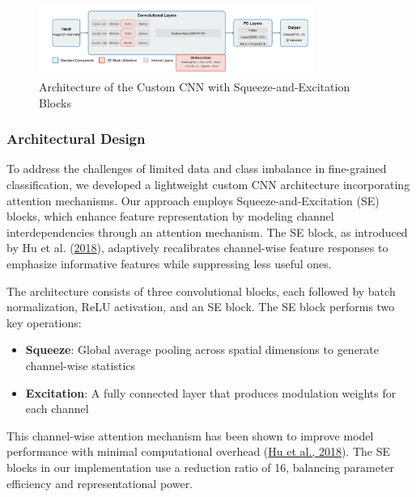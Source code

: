 \documentclass[a4paper,12pt]{report}
\begin{document}
\begin{figure}[h]
    \centering
    \includegraphics[width=0.8\textwidth]{images/architecture/improvedcnn.png}
    \caption{Architecture of the Custom CNN with Squeeze-and-Excitation Blocks}
    \label{fig:improvedcnn_architecture}
\end{figure}

\subsubsection{Architectural Design}

To address the challenges of limited data and class imbalance in fine-grained classification, we developed a lightweight custom CNN architecture incorporating attention mechanisms. Our approach employs Squeeze-and-Excitation (SE) blocks, which enhance feature representation by modeling channel interdependencies through an attention mechanism. The SE block, as introduced by Hu et al. (\href{https://openaccess.thecvf.com/content_cvpr_2018/papers/Hu_Squeeze-and-Excitation_Networks_CVPR_2018_paper.pdf}{2018}), adaptively recalibrates channel-wise feature responses to emphasize informative features while suppressing less useful ones.

The architecture consists of three convolutional blocks, each followed by batch normalization, ReLU activation, and an SE block. The SE block performs two key operations:
\begin{itemize}
    \item \textbf{Squeeze}: Global average pooling across spatial dimensions to generate channel-wise statistics
    \item \textbf{Excitation}: A fully connected layer that produces modulation weights for each channel
\end{itemize}

This channel-wise attention mechanism has been shown to improve model performance with minimal computational overhead (\href{https://openaccess.thecvf.com/content_cvpr_2018/papers/Hu_Squeeze-and-Excitation_Networks_CVPR_2018_paper.pdf}{Hu et al., 2018}). The SE blocks in our implementation use a reduction ratio of 16, balancing parameter efficiency and representational power.
\end{document}
